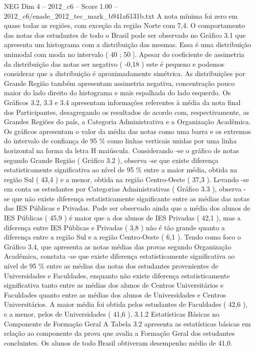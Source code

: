 \begin{textsample}{NEG Dim 4 – 2012\_c6 – Score 1.00 – 2012\_c6/enade\_2012\_tec\_mark\_b941a6131b.txt}
A nota mínima foi zero em quase todas as regiões, com exceção da região Norte com 7,4.
O comportamento das notas dos estudantes de todo o Brasil pode ser observado no Gráfico 3.1 que apresenta um histograma com a distribuição das mesmas.
Essa é uma distribuição unimodal com moda no intervalo ( 40 ; 50 ].
Apesar do coeficiente de assimetria da distribuição das notas ser negativo ( -0,18 ) este é pequeno e podemos considerar que a distribuição é aproximadamente simétrica.
As distribuições por Grande Região também apresentam assimetria negativa, concentração pouco maior do lado direito do histograma e mais espalhada do lado esquerdo.
Os Gráficos 3.2, 3.3 e 3.4 apresentam informações referentes à média da nota final dos Participantes, desagregando os resultados de acordo com, respectivamente, as Grandes Regiões do país, a Categoria Administrativa e a Organização Acadêmica.
Os gráficos apresentam o valor da média das notas como uma barra e os extremos do intervalo de confiança de 95 \% como linhas verticais unidas por uma linha horizontal na forma da letra H maiúscula.
Considerando -se o gráfico de notas segundo Grande Região ( Gráfico 3.2 ), observa -se que existe diferença estatisticamente significativa ao nível de 95 \% entre a maior média, obtida na região Sul ( 43,4 ) e a menor, obtida na região Centro-Oeste ( 37,3 ).
Levando -se em conta os estudantes por Categorias Administrativas ( Gráfico 3.3 ), observa -se que não existe diferença estatisticamente significante entre as médias das notas das IES Públicas e Privadas.
Pode ser observado ainda que a média dos alunos de IES Públicas ( 45,9 ) é maior que a dos alunos de IES Privadas ( 42,1 ), mas a diferença entre IES Públicas e Privadas ( 3,8 ) não é tão grande quanto a diferença entre a região Sul e a região Centro-Oeste ( 6,1 ).
Tendo como foco o Gráfico 3.4, que apresenta as notas médias das provas segundo Organização Acadêmica, constata -se que existe diferença estatisticamente significativa ao nível de 95 \% entre as médias das notas dos estudantes provenientes de Universidades e Faculdades, enquanto não existe diferença estatisticamente significativa tanto entre as médias dos alunos de Centros Universitários e Faculdades quanto entre as médias dos alunos de Universidades e Centros Universitários.
A maior média foi obtida pelos estudantes de Faculdades ( 42,6 ), e a menor, pelos de Universidades ( 41,6 ). 3.1.2 Estatísticas Básicas no Componente de Formação Geral A Tabela 3.2 apresenta as estatísticas básicas em relação ao componente da prova que avalia a Formação Geral dos estudantes concluintes.
Os alunos de todo Brasil obtiveram desempenho médio de 41,0.

\end{textsample}
